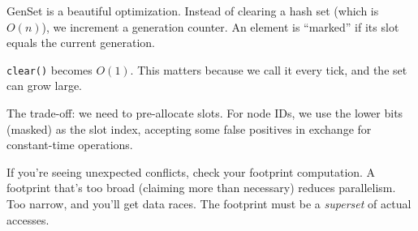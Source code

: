\begin{commentary}
GenSet is a beautiful optimization. Instead of clearing a hash set (which is $O(n)$), we increment a generation counter. An element is ``marked'' if its slot equals the current generation.

\texttt{clear()} becomes $O(1)$. This matters because we call it every tick, and the set can grow large.

The trade-off: we need to pre-allocate slots. For node IDs, we use the lower bits (masked) as the slot index, accepting some false positives in exchange for constant-time operations.
\end{commentary}

\begin{protip}
If you're seeing unexpected conflicts, check your footprint computation. A footprint that's too broad (claiming more than necessary) reduces parallelism. Too narrow, and you'll get data races. The footprint must be a \emph{superset} of actual accesses.
\end{protip}
